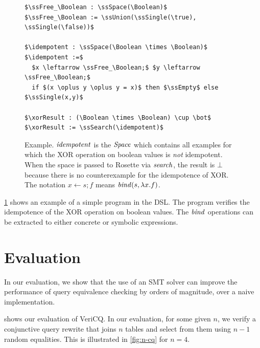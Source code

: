 \begin{figure}
\begin{lstlisting}
$\ssFree_\Boolean : \ssSpace(\Boolean)$
$\ssFree_\Boolean := \ssUnion(\ssSingle(\true), \ssSingle(\false))$

$\idempotent : \ssSpace(\Boolean \times \Boolean)$
$\idempotent :=$
  $x \leftarrow \ssFree_\Boolean;$ $y \leftarrow \ssFree_\Boolean;$
  if $(x \oplus y \oplus y = x)$ then $\ssEmpty$ else $\ssSingle(x,y)$

$\xorResult : (\Boolean \times \Boolean) \cup \bot$
$\xorResult := \ssSearch(\idempotent)$
\end{lstlisting}
\caption{
\SpaceSearch Example. $\mathit{idempotent}$ is the $\mathit{Space}$ which contains all examples for
which the XOR operation on boolean values is \emph{not} idempotent. When the space is
passed to Rosette via $\mathit{search}$, the result is $\bot$ because there is no
counterexample for the idempotence of XOR. The notation $x \leftarrow s; f$
means $\mathit{bind}(s,\lambda x. f)$.
}
\label{fig:rosette-example}
\end{figure}

\cref{fig:rosette-example} shows an example of a simple program in the \SpaceSearch DSL. The program verifies the idempotence of
the XOR operation on boolean values. The $\mathit{bind}$ operations can be extracted 
to either concrete or symbolic expressions.




\section{Evaluation}

In our evaluation, we show that the use of an SMT
solver can improve the performance of query equivalence checking by
orders of magnitude, over a naive implementation. 

 shows our evaluation of VeriCQ. In our evaluation,
for some given $n$, we verify a conjunctive query rewrite 
that joins $n$
tables and select from them using $n - 1$ random equalities.
This is illustrated in \cref{fig:n-cq} for $n = 4$. 


